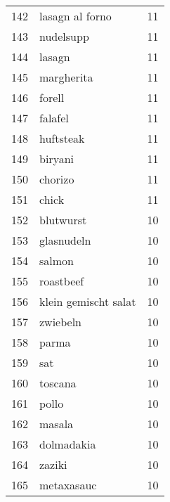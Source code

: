 \begin{tabular}{llr}
142  &                                    lasagn al forno &     11 \\
143  &                                          nudelsupp &     11 \\
144  &                                             lasagn &     11 \\
145  &                                         margherita &     11 \\
146  &                                             forell &     11 \\
147  &                                            falafel &     11 \\
148  &                                          huftsteak &     11 \\
149  &                                            biryani &     11 \\
150  &                                            chorizo &     11 \\
151  &                                              chick &     11 \\
152  &                                          blutwurst &     10 \\
153  &                                         glasnudeln &     10 \\
154  &                                             salmon &     10 \\
155  &                                          roastbeef &     10 \\
156  &                               klein gemischt salat &     10 \\
157  &                                           zwiebeln &     10 \\
158  &                                              parma &     10 \\
159  &                                                sat &     10 \\
160  &                                            toscana &     10 \\
161  &                                              pollo &     10 \\
162  &                                             masala &     10 \\
163  &                                         dolmadakia &     10 \\
164  &                                             zaziki &     10 \\
165  &                                         metaxasauc &     10 \\

\end{tabular}

